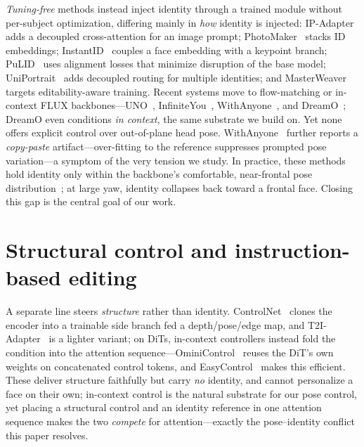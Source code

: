 \emph{Tuning-free} methods instead inject identity through a trained module without per-subject optimization, differing mainly in \emph{how} identity is injected: IP-Adapter~\cite{ipadapter} adds a decoupled cross-attention for an image prompt; PhotoMaker~\cite{photomaker} stacks ID embeddings; InstantID~\cite{instantid} couples a face embedding with a keypoint branch; PuLID~\cite{pulid} uses alignment losses that minimize disruption of the base model; UniPortrait~\cite{uniportrait} adds decoupled routing for multiple identities; and MasterWeaver~\cite{masterweaver} targets editability-aware training. Recent systems move to flow-matching or in-context FLUX backbones---UNO~\cite{uno}, InfiniteYou~\cite{infiniteyou}, WithAnyone~\cite{withanyone}, and DreamO~\cite{dreamo}; DreamO even conditions \emph{in context}, the same substrate we build on. Yet none offers explicit control over out-of-plane head pose. WithAnyone~\cite{withanyone} further reports a \emph{copy-paste} artifact---over-fitting to the reference suppresses prompted pose variation---a symptom of the very tension we study. In practice, these methods hold identity only within the backbone's comfortable, near-frontal pose distribution~\cite{beyondfacial}; at large yaw, identity collapses back toward a frontal face. Closing this gap is the central goal of our work.

\section{Structural control and instruction-based editing}
A separate line steers \emph{structure} rather than identity. ControlNet~\cite{controlnet} clones the encoder into a trainable side branch fed a depth/pose/edge map, and T2I-Adapter~\cite{t2iadapter} is a lighter variant; on DiTs, in-context controllers instead fold the condition into the attention sequence---OminiControl~\cite{ominicontrol} reuses the DiT's own weights on concatenated control tokens, and EasyControl~\cite{easycontrol} makes this efficient. These deliver structure faithfully but carry \emph{no} identity, and cannot personalize a face on their own; in-context control is the natural substrate for our pose control, yet placing a structural control and an identity reference in one attention sequence makes the two \emph{compete} for attention---exactly the pose--identity conflict this paper resolves.

